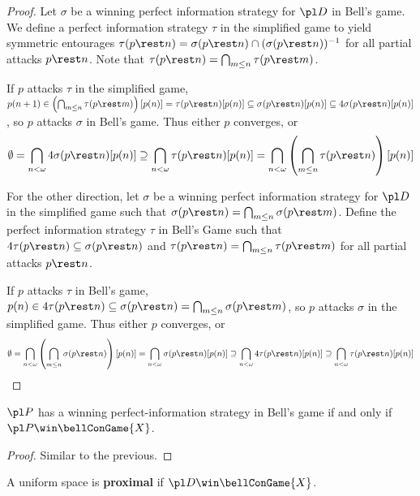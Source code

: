 \begin{proof}
  Let $\sigma$ be a winning perfect information strategy for $\pl D$ in Bell's game. We define a perfect information strategy $\tau$ in the simplified game to yield symmetric entourages $\tau(p\rest n)=\sigma(p\rest n)\cap(\sigma(p\rest n))^{-1}$ for all partial attacks $p\rest n$. Note that $\tau(p\rest n)=\bigcap_{m\leq n}\tau(p\rest m)$.

  If $p$ attacks $\tau$ in the simplified game, $p(n+1)\in\left(\bigcap_{m\leq n}\tau(p\rest m)\right)[p(n)]=\tau(p\rest n)[p(n)]\subseteq\sigma(p\rest n)[p(n)]\subseteq 4\sigma(p\rest n)[p(n)]$, so $p$ attacks $\sigma$ in Bell's game. Thus either $p$ converges, or
    \[
      \emptyset
        =
      \bigcap_{n<\omega} 4\sigma(p\rest n)[p(n)]
        \supseteq
      \bigcap_{n<\omega}\tau(p\rest n)[p(n)]
        =
      \bigcap_{n<\omega}\left(\bigcap_{m\leq n}\tau(p\rest n)\right)[p(n)]
    \]

  For the other direction, let $\sigma$ be a winning perfect information strategy for $\pl D$ in the simplified game such that $\sigma(p\rest n)=\bigcap_{m\leq n}\sigma(p\rest m)$. Define the perfect information strategy $\tau$ in Bell's Game such that $4\tau(p\rest n)\subseteq \sigma(p\rest n)$ and $\tau(p\rest n)=\bigcap_{m\leq n}\tau(p\rest m)$ for all partial attacks $p\rest n$.

  If $p$ attacks $\tau$ in Bell's game, $p(n)\in 4\tau(p\rest n)\subseteq\sigma(p\rest n)=\bigcap_{m\leq n}\sigma(p\rest m)$, so $p$ attacks $\sigma$ in the simplified game. Thus either $p$ converges, or
    \[
      \emptyset
        =
      \bigcap_{n<\omega}\left(\bigcap_{m\leq n}\sigma(p\rest n)\right)[p(n)]
        =
      \bigcap_{n<\omega}\sigma(p\rest n)[p(n)]
        \supseteq
      \bigcap_{n<\omega}4\tau(p\rest n)[p(n)]
        \supseteq
      \bigcap_{n<\omega}\tau(p\rest n)[p(n)]
    \]
\end{proof}

\begin{prop}
$\pl P$ has a winning perfect-information strategy in Bell's game if and only if $\pl P \win \bellConGame{X}$.
\end{prop}

\begin{proof}
  Similar to the previous.
\end{proof}

\begin{defn}
  A uniform space is \textbf{proximal} if $\pl D \win \bellConGame{X}$.
\end{defn}

